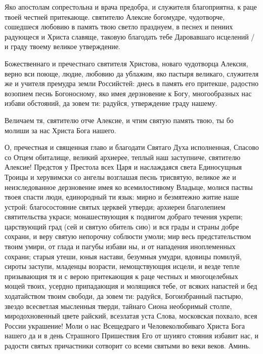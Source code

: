 \begin{mymulticols}



Яко апостолам сопрестольна и врача предобра,  и служителя благоприятна,  к раце твоей честней притекающе. святителю Алексие богомудре, чудотворче,  сошедшеся любовию в память твою светло празднуем,  в песнех и пениих радующеся и Христа славяще,  таковую благодать тебе Даровавшаго исцелений / и граду твоему великое утверждение.



Божественнаго и пречестнаго святителя Христова, новаго чудотворца Алексия, верно вси поюще, людие, любовию да ублажим, яко пастыря великаго, служителя же и учителя премудра земли Российстей: днесь в память его притекше, радостно возопием песнь Богоносному, яко имея дерзновение к Богу, многообразных нас избави обстояний, да зовем ти: радуйся, утверждение граду нашему.




Величаем тя, святителю отче Алексие, и чтим святую память твою, ты бо молиши за нас Христа Бога нашего.




О,  пречестная и священная  главо  и благодати Святаго Духа исполненная, Спасово со Отцем обиталище, великий архиерее, теплый наш заступниче, святителю Алексие! Предстоя у Престола всех Царя и наслаждаяся света Единосущныя Троицы и херувимски со ангелы возглашая песнь трисвятую, великое же и неизследованное дерзновение имея ко всемилостивому Владыце, молися паствы твоея спасти люди, единородный ти язык: мирно и безмятежно житие наше устрой: благосостояние святых церквей утверди; архиереи благолепием святительства украси; монашествующия к подвигом добраго течения укрепи; царствующий град (сей и святую обитель сию) и вся грады и страны добре сохрани, и веру святую непорочну соблюсти умоли; мир весь предстательством твоим умири, от глада и пагубы избави ны, и от нападения иноплеменных сохрани; старыя утеши, юныя настави, безумныя умудри, вдовицы помилуй, сироты заступи, младенцы возрасти, немощствующия исцели, и везде тепле призывающия тя и с верою притекающия к раце честных и многоцелебных мощей твоих, усердно припадающия и молящияся тебе, от всяких напастей и бед ходатайством твоим свободи, да зовем ти: радуйся, Богоизбранный пастырю, звездо всесветлая мысленныя тверди, тайнаго Сиона необоримый столпе, миродохновенный цвете райский, всезлатая уста Слова, московская похвало, всея России украшение! Моли о нас Всещедраго и Человеколюбиваго Христа Бога нашего да и в день Страшного Пришествия Его от шуияго стояния избавит нас, и радости святых причастники сотворит со всеми святыми во веки веков. Аминь.


\end{mymulticols}

